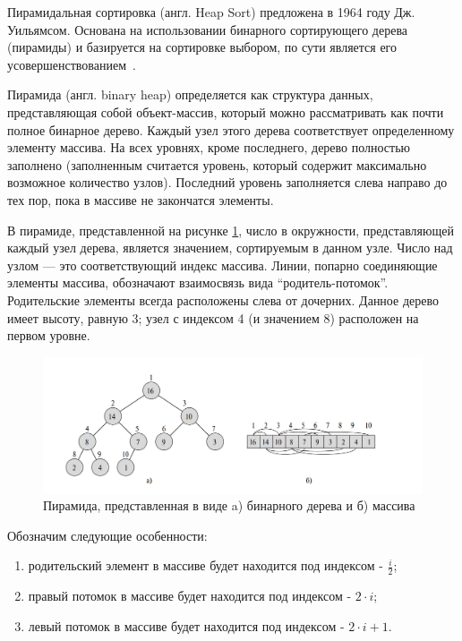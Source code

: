 Пирамидальная сортировка (англ. Heap Sort) предложена в 1964 году Дж. Уильямсом. Основана на использовании бинарного сортирующего дерева (пирамиды) и базируется на сортировке выбором, по сути является его усовершенствованием~\cite{book_lipachev, book_sort_algorithms, book_knut, book_kormen}.

Пирамида (англ. binary heap) определяется как структура данных, представляющая собой объект-массив, который можно рассматривать как почти полное бинарное дерево.
Каждый узел этого дерева соответствует определенному элементу массива.
На всех уровнях, кроме последнего, дерево полностью заполнено (заполненным считается уровень, который содержит максимально возможное количество узлов).
Последний уровень заполняется слева направо до тех пор, пока в массиве не закончатся элементы.

В пирамиде, представленной на рисунке \ref{fig:heap_structs}, число в окружности, представляющей каждый узел дерева, является значением, сортируемым в данном узле. Число над узлом — это соответствующий индекс массива. Линии, попарно соединяющие элементы массива, обозначают взаимосвязь вида “родитель-потомок”. Родительские элементы всегда расположены слева от дочерних. Данное дерево имеет высоту, равную 3; узел с индексом 4 (и значением 8) расположен на первом уровне.

\begin{figure}[h]
	\centering
	\includegraphics[height=0.25\textheight]{img/heap_structs.png}
	\caption{Пирамида, представленная в виде a) бинарного дерева и б) массива}
	\label{fig:heap_structs}
\end{figure}

Обозначим следующие особенности:
\begin{enumerate}
	\item родительский элемент в массиве будет находится под индексом - $\frac{i}{2}$;
	\item правый потомок в массиве будет находится под индексом - $2 \cdot i$;
	\item левый потомок в массиве будет находится под индексом - $2 \cdot i + 1$.
\end{enumerate}

